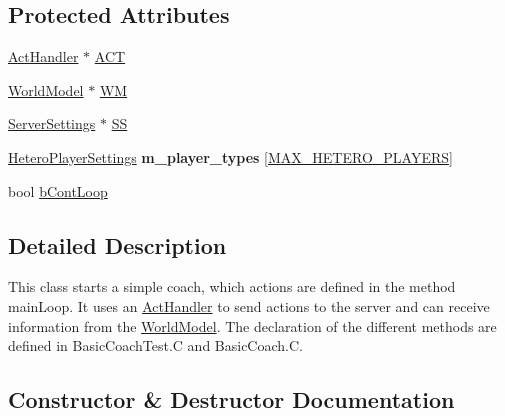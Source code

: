 \subsection*{Protected Attributes}
\begin{DoxyCompactItemize}
\item 
\hyperlink{classActHandler}{Act\+Handler} $\ast$ \hyperlink{classBasicCoach_a3bbce5d14f0ceb04618a08c8005158fc}{A\+CT}
\item 
\hyperlink{classWorldModel}{World\+Model} $\ast$ \hyperlink{classBasicCoach_a82f305b964424a2200e875a73871c7fa}{WM}
\item 
\hyperlink{classServerSettings}{Server\+Settings} $\ast$ \hyperlink{classBasicCoach_acdde95fc653803caad2630b8d2f9026e}{SS}
\item 
\hyperlink{classHeteroPlayerSettings}{Hetero\+Player\+Settings} {\bfseries m\+\_\+player\+\_\+types} \mbox{[}\hyperlink{SoccerTypes_8h_ad5c84ed18f3f85d913cee3d8279b8879}{M\+A\+X\+\_\+\+H\+E\+T\+E\+R\+O\+\_\+\+P\+L\+A\+Y\+E\+RS}\mbox{]}\hypertarget{classBasicCoach_aca59e803723c90a74ffb76566fd31bf0}{}\label{classBasicCoach_aca59e803723c90a74ffb76566fd31bf0}

\item 
bool \hyperlink{classBasicCoach_a0d14913a2364960fdc647dbad35dd71d}{b\+Cont\+Loop}
\end{DoxyCompactItemize}


\subsection{Detailed Description}
This class starts a simple coach, which actions are defined in the method main\+Loop. It uses an \hyperlink{classActHandler}{Act\+Handler} to send actions to the server and can receive information from the \hyperlink{classWorldModel}{World\+Model}. The declaration of the different methods are defined in Basic\+Coach\+Test.\+C and Basic\+Coach.\+C. 

\subsection{Constructor \& Destructor Documentation}
